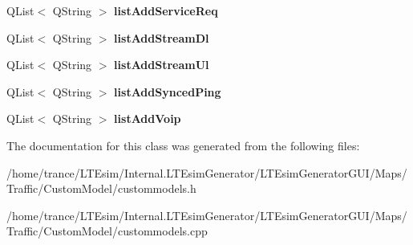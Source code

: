 \begin{DoxyCompactItemize}
\item 
Q\+List$<$ Q\+String $>$ {\bfseries list\+Add\+Service\+Req}\hypertarget{class_custommodels_a97c30cfb2f6184135a2c6ef09b8235a2}{}\label{class_custommodels_a97c30cfb2f6184135a2c6ef09b8235a2}

\item 
Q\+List$<$ Q\+String $>$ {\bfseries list\+Add\+Stream\+Dl}\hypertarget{class_custommodels_a05cb3026ac2d90979fe5d99d6c9046e6}{}\label{class_custommodels_a05cb3026ac2d90979fe5d99d6c9046e6}

\item 
Q\+List$<$ Q\+String $>$ {\bfseries list\+Add\+Stream\+Ul}\hypertarget{class_custommodels_ab81c77fdbb7a7a16c24aed2c56947cd3}{}\label{class_custommodels_ab81c77fdbb7a7a16c24aed2c56947cd3}

\item 
Q\+List$<$ Q\+String $>$ {\bfseries list\+Add\+Synced\+Ping}\hypertarget{class_custommodels_adfc003816e04592869c1bbd03ce4ef30}{}\label{class_custommodels_adfc003816e04592869c1bbd03ce4ef30}

\item 
Q\+List$<$ Q\+String $>$ {\bfseries list\+Add\+Voip}\hypertarget{class_custommodels_aee878aff7dc78ea98afab2b031e79e62}{}\label{class_custommodels_aee878aff7dc78ea98afab2b031e79e62}

\end{DoxyCompactItemize}


The documentation for this class was generated from the following files\+:\begin{DoxyCompactItemize}
\item 
/home/trance/\+L\+T\+Esim/\+Internal.\+L\+T\+Esim\+Generator/\+L\+T\+Esim\+Generator\+G\+U\+I/\+Maps/\+Traffic/\+Custom\+Model/custommodels.\+h\item 
/home/trance/\+L\+T\+Esim/\+Internal.\+L\+T\+Esim\+Generator/\+L\+T\+Esim\+Generator\+G\+U\+I/\+Maps/\+Traffic/\+Custom\+Model/custommodels.\+cpp\end{DoxyCompactItemize}
